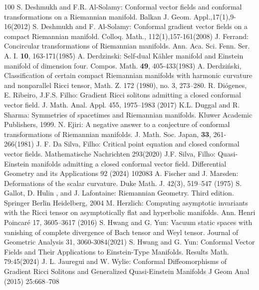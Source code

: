 \documentclass[10pt,leqno,oneside]{amsart}
\begin{document}
{\begin{thebibliography}{100}
       { S. Deshmukh and F.R. Al-Solamy: Conformal vector fields and conformal transformations on a Riemannian manifold. Balkan J. Geom. Appl.,17(1),9-16(2012)}
       { S. Deshmukh and F. Al-Solamy: Conformal gradient vector fields on a compact Riemannian manifold. Colloq. Math., 112(1),157-161(2008)}
       J. Ferrand: Concircular transformations of Riemannian manifolds. Ann. Aca. Sci. Fenn. Ser. A. I. {\bf 10}, 163-171(1985)
       A. Derdzinski: Self-dual K\"ahler manifold and Einstein manifold of dimension four. Compos. Math. {\bf 49}, 405-433(1983)
       A. Derdzi\'nski, Classification of certain compact Riemannian manifolds with harmonic curvature and nonparallel Ricci tensor, Math. Z. 172 (1980), no. 3, 273–280.
       R. Di\'ogenes, E. Ribeiro, J.F.S. Filho: Gradient Ricci solitons admitting a closed conformal vector field. J. Math. Anal. Appl. 455, 1975–1983 (2017)
       K.L. Duggal and R. Sharma: Symmetries of spacetimes and Riemannian manifolds. Kluwer Academic Publishers, 1999.
       N. Ejiri: A negative answer to a conjecture of conformal transformations of Riemannian manifolds. J. Math. Soc. Japan, {\bf 33}, 261-266(1981)
       J. F. Da Silva, Filho: Critical point equation and closed conformal vector fields. Mathematische Nachrichten 293(2020)
       J.F. Silva, Filho: Quasi-Einstein manifolds admitting a closed conformal vector field. Differential Geometry and its Applications 92 (2024) 102083
       A. Fischer and J. Marsden: Deformations of the scalar curvature. Duke Math. J. 42(3), 519–547 (1975)
       S. Gallot, D. Hulin , and J. Lafontaine: Riemannian Geometry. Third edition. Springer Berlin Heidelberg, 2004
       M.  Herzlich: Computing asymptotic invariants with the Ricci tensor on asymptotically flat and hyperbolic manifolds. Ann. Henri Poincar\'e 17, 3605–3617 (2016)
       S. Hwang and G. Yun: Vacuum static spaces with vanishing of complete divergence of Bach tensor and Weyl tensor. Journal of Geometric Analysis 31, 3060-3084(2021)
       S. Hwang and G. Yun: Conformal Vector Fields and Their Applications to Einstein-Type Manifolds. Results Math. 79:45(2024)
       J. L. Jauregui and W. Wylie: Conformal Diffeomorphisms of Gradient Ricci Solitons and Generalized Quasi-Einstein Manifolds J Geom Anal (2015) 25:668–708

\end{thebibliography}}
\end{document}
